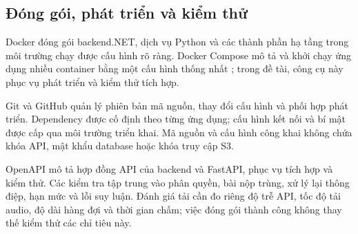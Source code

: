 \subsection{Đóng gói, phát triển và kiểm thử}

Docker đóng gói backend.NET, dịch vụ Python và các thành phần hạ tầng trong môi trường chạy được cấu hình rõ ràng. Docker Compose mô tả và khởi chạy ứng dụng nhiều container bằng một cấu hình thống nhất \parencite{ch4_docker_compose}; trong đề tài, công cụ này phục vụ phát triển và kiểm thử tích hợp.

Git và GitHub quản lý phiên bản mã nguồn, thay đổi cấu hình và phối hợp phát triển. Dependency được cố định theo từng ứng dụng; cấu hình kết nối và bí mật được cấp qua môi trường triển khai. Mã nguồn và cấu hình công khai không chứa khóa API, mật khẩu database hoặc khóa truy cập S3.

OpenAPI mô tả hợp đồng API của backend và FastAPI, phục vụ tích hợp và kiểm thử. Các kiểm tra tập trung vào phân quyền, bài nộp trùng, xử lý lại thông điệp, hạn mức và lỗi suy luận. Đánh giá tải cần đo riêng độ trễ API, tốc độ tải audio, độ dài hàng đợi và thời gian chấm; việc đóng gói thành công không thay thế kiểm thử các chỉ tiêu này.
